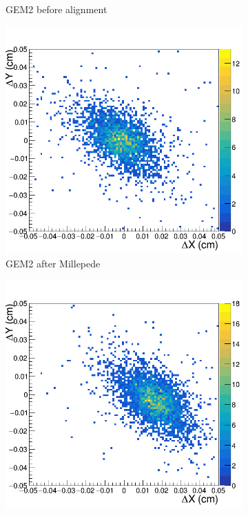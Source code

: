 \begin{figure}[h!]
\begin{subfigure}[l]{.45\textwidth}
   \caption{GEM2 before alignment}
   \label{fig:GEM2_before}
 \end{subfigure}
 \begin{subfigure}[r]{.45\textwidth}
   \centering
   \includegraphics[width=\linewidth]{thesis_figures/alignment/Run_3211_after_millepede/square/GEM2.png}
   \caption{GEM2 after Millepede}
   \label{fig:GEM2_after}
 \end{subfigure}
 \begin{subfigure}[l]{.45\textwidth}
   \centering
   \includegraphics[width=\linewidth]{thesis_figures/alignment/Run_3211_before/square/GEM4.png}


\end{subfigure}
\end{figure}
